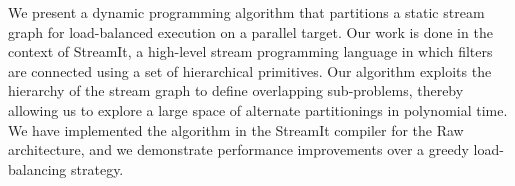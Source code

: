We present a dynamic programming algorithm that partitions a static stream
graph for load-balanced execution on a parallel target.  Our work is done in
the context of StreamIt, a high-level stream programming language in which
filters are connected using a set of hierarchical primitives.  Our algorithm
exploits the hierarchy of the stream graph to define overlapping
sub-problems, thereby allowing us to explore a large space of alternate
partitionings in polynomial time.  We have implemented the algorithm in the
StreamIt compiler for the Raw architecture, and we demonstrate performance
improvements over a greedy load-balancing strategy.
